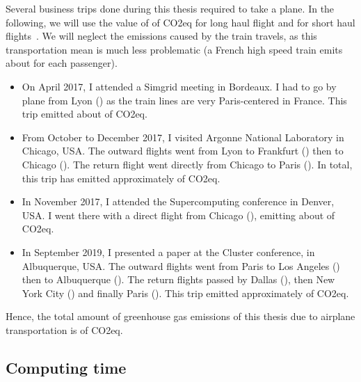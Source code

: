         Several business trips done during this thesis required to take a plane. In the following, we will use the value
        of  of CO2eq for long haul flight and  for short haul
        flights~\cite{co2_flight}. We will neglect the emissions caused by the train travels, as this transportation
        mean is much less problematic (a French high speed train emits about  for each
        passenger).
        \begin{itemize}
            \item On April 2017, I attended a Simgrid meeting in Bordeaux. I had to go by plane from Lyon
                () as the train lines are very Paris-centered in France. This trip emitted about
                 of CO2eq.
            \item From October to December 2017, I visited Argonne National Laboratory in Chicago, USA. The outward
                flights went from Lyon to Frankfurt () then to Chicago ().
                The return flight went directly from Chicago to Paris ().  In total, this trip has
                emitted approximately  of CO2eq.
            \item In November 2017, I attended the Supercomputing conference in Denver, USA. I went there with a direct
                flight from Chicago (), emitting about  of CO2eq.
            \item In September 2019, I presented a paper at the Cluster conference, in Albuquerque, USA. The outward
                flights went from Paris to Los Angeles () then to Albuquerque
                (). The return flights passed by Dallas (), then New York
                City () and finally Paris (). This trip emitted
                approximately  of CO2eq.
        \end{itemize}
        Hence, the total amount of greenhouse gas emissions of this thesis due to airplane transportation is
         of CO2eq.

    \subsection*{Computing time}%

